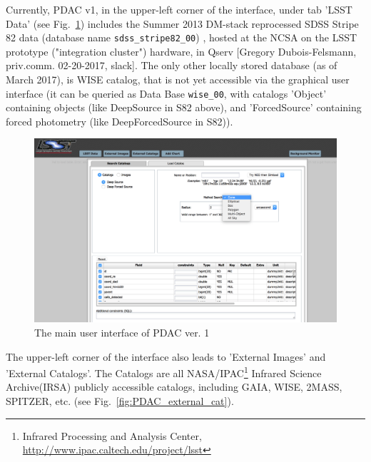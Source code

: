 \documentclass[fleqn,usenatbib]{mnras} %
\begin{document}
Currently, PDAC v1,  in the upper-left corner of the interface, under tab 'LSST Data' (see Fig.~\ref{fig:PDAC_interface}) includes the Summer 2013 DM-stack reprocessed SDSS Stripe 82 data (database name \verb|sdss_stripe82_00|) , hosted at the NCSA on the LSST prototype ("integration cluster") hardware, in Qserv [Gregory Dubois-Felsmann, priv.comm. 02-20-2017, slack].  The only other locally stored database (as of March 2017), is  WISE catalog, that is not yet accessible via the graphical user interface (it can be queried as Data Base \verb|wise_00|, with catalogs 'Object' containing objects (like DeepSource in S82 above), and 'ForcedSource' containing forced photometry (like DeepForcedSource in S82)). 


\begin{figure}
\includegraphics[width=\textwidth]{figs/1_PDAC_interface}
\caption{The main user interface of PDAC ver. 1 }
\label{fig:PDAC_interface}
\end{figure}


The upper-left corner of the interface also leads to 'External Images' and 'External Catalogs'. The Catalogs are all NASA/IPAC\footnote{Infrared Processing and Analysis Center, \url{http://www.ipac.caltech.edu/project/lsst}}  Infrared Science Archive(IRSA) publicly accessible catalogs, including GAIA, WISE, 2MASS, SPITZER, etc. (see Fig.~\ref{fig:PDAC_external_cat}).
\end{document}
